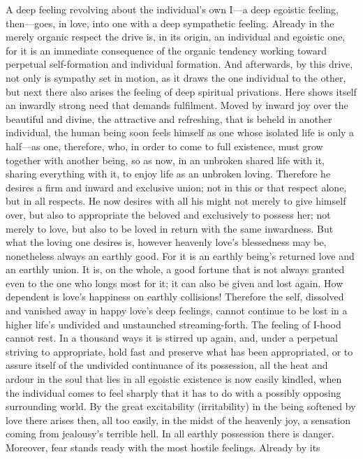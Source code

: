 \documentclass[12pt,a4paper]{book}
\begin{document}
A deep feeling revolving about the individual's own I---a deep egoistic
feeling, then---goes, in love, into one with a deep sympathetic feeling.
Already in the merely organic respect the drive is, in its origin, an
individual and egoistic one, for it is an immediate consequence of the
organic tendency working toward perpetual self-formation and individual
formation. And afterwards, by this drive, not only is sympathy set in
motion, as it draws the one individual to the other, but next there also
arises the feeling of deep spiritual privations. Here shows itself an
inwardly strong need that demands fulfilment. Moved by inward joy over the
beautiful and divine, the attractive and refreshing, that is beheld in
another individual, the human being soon feels himself as one whose
isolated life is only a half---as one, therefore, who, in order to come to
full existence, must grow together with another being, so as now, in an
unbroken shared life with it, sharing everything with it, to enjoy life as
an unbroken loving. Therefore he desires a firm and inward and exclusive
union; not in this or that respect alone, but in all respects. He now
desires with all his might not merely to give himself over, but also to
appropriate the beloved and exclusively to possess her; not merely to love,
but also to be loved in return with the same inwardness.
But what the loving one desires is, however heavenly love's blessedness may
be, nonetheless always an earthly good. For it is an earthly being's
returned love and an earthly union. It is, on the whole, a good fortune
that is not always granted even to the one who longs most for it; it can
also be given and lost again. How dependent is love's happiness on earthly
collisions! Therefore the self, dissolved and vanished away in happy love's
deep feelings, cannot continue to be lost in a higher life's undivided and
unstaunched streaming-forth. The feeling of I-hood cannot rest. In a
thousand ways it is stirred up again, and, under a perpetual striving to
appropriate, hold fast and preserve what has been appropriated, or to
assure itself of the undivided continuance of its possession, all the heat and
ardour in the soul that lies in all egoistic existence is now easily
kindled, when the individual comes to feel sharply that it has to do with a
possibly opposing surrounding world. By the great excitability
(irritability) in the being softened by love there arises then, all too
easily, in the midst of the heavenly joy, a sensation coming from
jealousy's terrible hell. In all earthly possession there is danger.
Moreover, fear stands ready with the most hostile feelings. Already by its
\end{document}
